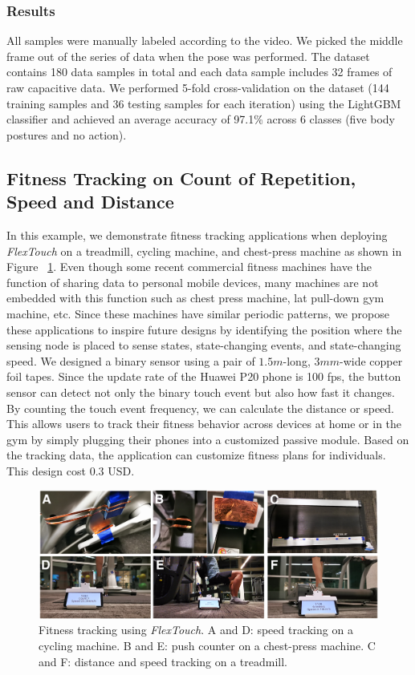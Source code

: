\subsubsection{Results}
All samples were manually labeled according to the video. We picked the middle frame out of the series of data when the pose was performed. The dataset contains 180 data samples in total and each data sample includes 32 frames of raw capacitive data. We performed 5-fold cross-validation on the dataset (144 training samples and 36 testing samples for each iteration) using the LightGBM classifier and achieved an average accuracy of 97.1\% across 6 classes (five body postures and no action).

\subsection{Fitness Tracking on Count of Repetition, Speed and Distance}
In this example, we demonstrate fitness tracking applications when deploying \textit{FlexTouch} on a treadmill, cycling machine, and chest-press machine as shown in Figure ~\ref{fig:fitness}. Even though some recent commercial fitness machines have the function of sharing data to personal mobile devices, many machines are not embedded with this function such as chest press machine, lat pull-down gym machine, etc. Since these machines have similar periodic patterns, we propose these applications to inspire future designs by identifying the position where the sensing node is placed to sense states, state-changing events, and state-changing speed. We designed a binary sensor using a pair of $1.5m$-long, $3 mm$-wide copper foil tapes. Since the update rate of the Huawei P20 phone is 100 fps, the button sensor can detect not only the binary touch event but also how fast it changes. By counting the touch event frequency, we can calculate the distance or speed. This allows users to track their fitness behavior across devices at home or in the gym by simply plugging their phones into a customized passive module. Based on the tracking data, the application can customize fitness plans for individuals. This design cost 0.3 USD.

\begin{figure}[ht]
\centering
  \includegraphics[width=0.95\columnwidth]{figures/gym.png}
  \setlength{\belowcaptionskip}{-6pt}
  \caption{Fitness tracking using \textit{FlexTouch}. A and D: speed tracking on a cycling machine. B and E: push counter on a chest-press machine. C and F: distance and speed tracking on a treadmill.}  
  \label{fig:fitness}
\end{figure}


